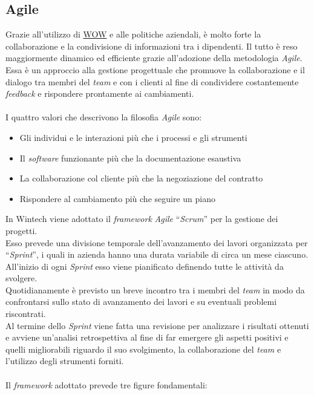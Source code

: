 \subsection{Agile}
Grazie all'utilizzo di \hyperref[WOW]{WOW} e alle politiche aziendali, è molto forte la collaborazione e la condivisione di informazioni tra i dipendenti. Il tutto è reso maggiormente dinamico ed efficiente grazie all'adozione della metodologia \emph{Agile}.\\
Essa è un approccio alla gestione progettuale che promuove la collaborazione e il dialogo tra membri del \emph{team} e con i clienti al fine di condividere costantemente \emph{feedback} e rispondere prontamente ai cambiamenti.\\\\
I quattro valori che descrivono la filosofia \emph{Agile} sono:
\begin{itemize}
    \item Gli individui e le interazioni più che i processi e gli strumenti 
    \item Il \emph{software} funzionante più che la documentazione esaustiva  
    \item La collaborazione col cliente più che la negoziazione del contratto 
    \item Rispondere al cambiamento più che seguire un piano\\
\end{itemize}
In Wintech viene adottato il \emph{framework} \emph{Agile} “\emph{Scrum}” per la gestione dei progetti.\\
Esso prevede una divisione temporale dell'avanzamento dei lavori organizzata per “\emph{Sprint}”, i quali in azienda hanno una durata variabile di circa un mese ciascuno.\\
All'inizio di ogni \emph{Sprint} esso viene pianificato definendo tutte le attività da svolgere.\\ 
Quotidianamente è previsto un breve incontro tra i membri del \emph{team} in modo da confrontarsi sullo stato di avanzamento dei lavori e su eventuali problemi riscontrati.\\
Al termine dello \emph{Sprint} viene fatta una revisione per analizzare i risultati ottenuti e avviene un'analisi retrospettiva al fine di far emergere gli aspetti positivi e quelli migliorabili riguardo il suo svolgimento, la collaborazione del \emph{team} e l'utilizzo degli strumenti forniti.\\\\
Il \emph{framework} adottato prevede tre figure fondamentali: 
